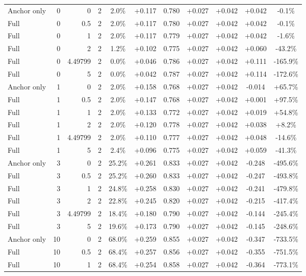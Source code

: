 \begin{table}[htbp]
\begin{tabular}{lrrrccccccc}
Anchor only & 0 & 0 & 2 & 2.0\% & +0.117 & 0.780 & +0.027 & +0.042 & +0.042 & -0.1\% \\
Full & 0 & 0.5 & 2 & 2.0\% & +0.117 & 0.780 & +0.027 & +0.042 & +0.042 & -0.1\% \\
Full & 0 & 1 & 2 & 2.0\% & +0.117 & 0.779 & +0.027 & +0.042 & +0.042 & -1.6\% \\
Full & 0 & 2 & 2 & 1.2\% & +0.102 & 0.775 & +0.027 & +0.042 & +0.060 & -43.2\% \\
Full & 0 & 4.49799 & 2 & 0.0\% & +0.046 & 0.786 & +0.027 & +0.042 & +0.111 & -165.9\% \\
Full & 0 & 5 & 2 & 0.0\% & +0.042 & 0.787 & +0.027 & +0.042 & +0.114 & -172.6\% \\
Anchor only & 1 & 0 & 2 & 2.0\% & +0.158 & 0.768 & +0.027 & +0.042 & -0.014 & +65.7\% \\
Full & 1 & 0.5 & 2 & 2.0\% & +0.147 & 0.768 & +0.027 & +0.042 & +0.001 & +97.5\% \\
Full & 1 & 1 & 2 & 2.0\% & +0.133 & 0.772 & +0.027 & +0.042 & +0.019 & +54.8\% \\
Full & 1 & 2 & 2 & 2.0\% & +0.120 & 0.778 & +0.027 & +0.042 & +0.038 & +8.2\% \\
Full & 1 & 4.49799 & 2 & 2.0\% & +0.110 & 0.777 & +0.027 & +0.042 & +0.048 & -14.6\% \\
Full & 1 & 5 & 2 & 2.4\% & +0.096 & 0.775 & +0.027 & +0.042 & +0.059 & -41.3\% \\
Anchor only & 3 & 0 & 2 & 25.2\% & +0.261 & 0.833 & +0.027 & +0.042 & -0.248 & -495.6\% \\
Full & 3 & 0.5 & 2 & 25.2\% & +0.260 & 0.833 & +0.027 & +0.042 & -0.247 & -493.8\% \\
Full & 3 & 1 & 2 & 24.8\% & +0.258 & 0.830 & +0.027 & +0.042 & -0.241 & -479.8\% \\
Full & 3 & 2 & 2 & 22.8\% & +0.245 & 0.820 & +0.027 & +0.042 & -0.215 & -417.4\% \\
Full & 3 & 4.49799 & 2 & 18.4\% & +0.180 & 0.790 & +0.027 & +0.042 & -0.144 & -245.4\% \\
Full & 3 & 5 & 2 & 19.6\% & +0.173 & 0.790 & +0.027 & +0.042 & -0.145 & -248.6\% \\
Anchor only & 10 & 0 & 2 & 68.0\% & +0.259 & 0.855 & +0.027 & +0.042 & -0.347 & -733.5\% \\
Full & 10 & 0.5 & 2 & 68.4\% & +0.257 & 0.856 & +0.027 & +0.042 & -0.355 & -751.5\% \\
Full & 10 & 1 & 2 & 68.4\% & +0.254 & 0.858 & +0.027 & +0.042 & -0.364 & -773.1\% \\

\end{tabular}
\end{table}
